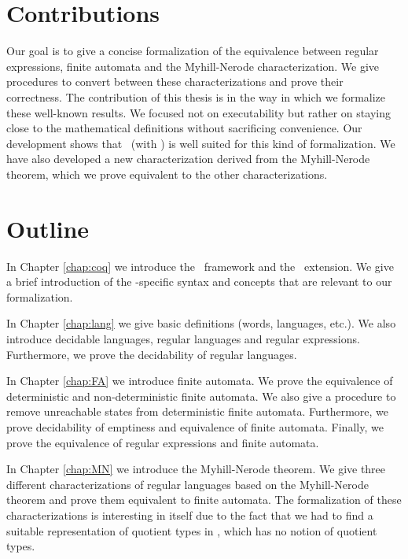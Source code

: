 \section{Contributions}
Our goal is to give a concise formalization of the equivalence between regular expressions, finite automata and the Myhill-Nerode characterization.
We give procedures to convert between these characterizations and prove their correctness.
The contribution of this thesis is in the way in which we formalize these well-known results.
We focused not on executability but rather on staying close to the mathematical definitions without sacrificing convenience.
Our development shows that \coq\ (with \ssreflect) is well suited for this kind of formalization.
We have also developed a new characterization derived from the Myhill-Nerode theorem, which we prove equivalent to the other characterizations.


\section{Outline}
In Chapter \ref{chap:coq} we introduce the \coq\ framework and the \ssreflect\ extension. 
We give a brief introduction of the \ssreflect-specific syntax and concepts that are relevant to our formalization.

In Chapter \ref{chap:lang} we give basic definitions (words, languages, etc.). 
We also introduce decidable languages, regular languages and regular expressions. 
Furthermore, we prove the decidability of regular languages.

In Chapter \ref{chap:FA} we introduce finite automata.
We prove the equivalence of deterministic and non-deterministic finite automata.
We also give a procedure to remove unreachable states from deterministic finite automata.
Furthermore, we prove decidability of emptiness and equivalence of finite automata.
Finally, we prove the equivalence of regular expressions and finite automata. 

In Chapter \ref{chap:MN} we introduce the Myhill-Nerode theorem.
We give three different characterizations of regular languages based on the Myhill-Nerode theorem and prove them equivalent to finite automata.
The formalization of these characterizations is interesting in itself due to the fact that we had to find a suitable representation of quotient types in \coq, which has no notion of quotient types.
